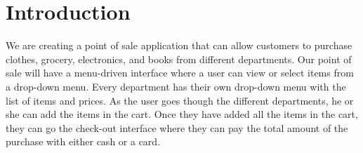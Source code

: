\documentclass[10pt,conference,onecolumn,compsoc]{IEEEtran}
\begin{document}
\maketitle


\IEEEdisplaynontitleabstractindextext



%
\IEEEpeerreviewmaketitle



\section{Introduction}




% 
% 
% 
% 


	We are creating a point of sale application that can allow  customers to purchase clothes, grocery, electronics, and books from different departments. Our point of sale will have a menu-driven interface where a user can view or select items from a drop-down menu. Every department has their own drop-down menu with the list of items and prices. As the user goes though the different departments, he or she can add the items in the cart. Once they have added all the items in the cart, they can go the check-out interface where they can pay the total amount of the purchase with either cash or a card.  \newline
\end{document}
